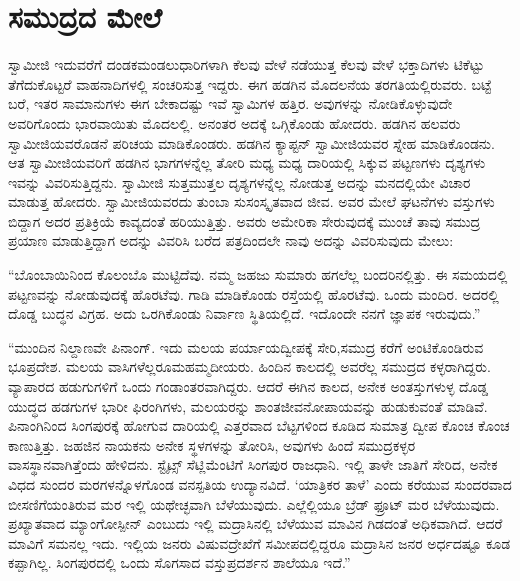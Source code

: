 
\chapter{ಸಮುದ್ರದ ಮೇಲೆ}

 ಸ್ವಾಮೀಜಿ ಇದುವರೆಗೆ ದಂಡಕಮಂಡಲುಧಾರಿಗಳಾಗಿ ಕೆಲವು ವೇಳೆ ನಡೆಯುತ್ತ ಕೆಲವು ವೇಳೆ ಭಕ್ತಾದಿಗಳು ಟಿಕೆಟ್ಟು ತೆಗೆದುಕೊಟ್ಟರೆ ವಾಹನಾದಿಗಳಲ್ಲಿ ಸಂಚರಿಸುತ್ತ ಇದ್ದರು. ಈಗ ಹಡಗಿನ ಮೊದಲನೆಯ ತರಗತಿಯಲ್ಲಿರುವರು. ಬಟ್ಟೆ ಬರೆ, ಇತರ ಸಾಮಾನುಗಳು ಈಗ ಬೇಕಾದಷ್ಟು ಇವೆ ಸ್ವಾಮಿಗಳ ಹತ್ತಿರ. ಅವುಗಳನ್ನು ನೋಡಿಕೊಳ್ಳುವುದೇ ಅವರಿಗೊಂದು ಭಾರವಾಯಿತು ಮೊದಲಲ್ಲಿ. ಅನಂತರ ಅದಕ್ಕೆ ಒಗ್ಗಿಕೊಂಡು ಹೋದರು. ಹಡಗಿನ ಹಲವರು ಸ್ವಾಮೀಜಿಯವರೊಡನೆ ಪರಿಚಯ ಮಾಡಿಕೊಂಡರು. ಹಡಗಿನ ಕ್ಯಾಪ್ಟನ್ ಸ್ವಾಮೀಜಿಯವರ ಸ್ನೇಹ ಮಾಡಿಕೊಂಡನು. ಆತ ಸ್ವಾಮೀಜಿಯವರಿಗೆ ಹಡಗಿನ ಭಾಗಗಳನ್ನೆಲ್ಲ ತೋರಿ ಮಧ್ಯ ಮಧ್ಯ ದಾರಿಯಲ್ಲಿ ಸಿಕ್ಕುವ ಪಟ್ಟಣಗಳು ದೃಶ್ಯಗಳು ಇವನ್ನು ವಿವರಿಸುತ್ತಿದ್ದನು. ಸ್ವಾಮೀಜಿ ಸುತ್ತಮುತ್ತಲ ದೃಶ್ಯಗಳನ್ನೆಲ್ಲ ನೋಡುತ್ತ ಅದನ್ನು ಮನದಲ್ಲಿಯೇ ವಿಚಾರ ಮಾಡುತ್ತ ಹೋದರು. ಸ್ವಾಮೀಜಿಯವರದು ತುಂಬಾ ಸುಸಂಸ್ಕೃತವಾದ ಜೀವ. ಅವರ ಮೇಲೆ ಘಟನೆಗಳು ವಸ್ತುಗಳು ಬಿದ್ದಾಗ ಅದರ ಪ್ರತಿಕ್ರಿಯೆ ಕಾವ್ಯದಂತೆ ಹರಿಯುತ್ತಿತ್ತು. ಅವರು ಅಮೇರಿಕಾ ಸೇರುವುದಕ್ಕೆ ಮುಂಚೆ ತಾವು ಸಮುದ್ರ ಪ್ರಯಾಣ ಮಾಡುತ್ತಿದ್ದಾಗ ಅದನ್ನು ವಿವರಿಸಿ ಬರೆದ ಪತ್ರದಿಂದಲೇ ನಾವು ಅದನ್ನು ವಿವರಿಸುವುದು ಮೇಲು: 

 “ಬೊಂಬಾಯಿನಿಂದ ಕೊಲಂಬೊ ಮುಟ್ಟಿದೆವು. ನಮ್ಮ ಜಹಜು ಸುಮಾರು ಹಗಲೆಲ್ಲ ಬಂದರಿನಲ್ಲಿತ್ತು. ಈ ಸಮಯದಲ್ಲಿ ಪಟ್ಟಣವನ್ನು ನೋಡುವುದಕ್ಕೆ ಹೊರಟೆವು. ಗಾಡಿ ಮಾಡಿಕೊಂಡು ರಸ್ತೆಯಲ್ಲಿ ಹೊರಟೆವು. ಒಂದು ಮಂದಿರ. ಅದರಲ್ಲಿ ದೊಡ್ಡ ಬುದ್ಧನ ವಿಗ್ರಹ. ಅದು ಒರಗಿಕೊಂಡು ನಿರ್ವಾಣ ಸ್ಥಿತಿಯಲ್ಲಿದೆ. ಇದೊಂದೇ ನನಗೆ ಜ್ಞಾಪಕ ಇರುವುದು.” 

\newpage

 “ಮುಂದಿನ ನಿಲ್ದಾಣವೇ ಪಿನಾಂಗ್. ಇದು ಮಲಯ ಪರ್ಯಾಯದ್ವೀಪಕ್ಕೆ ಸೇರಿ,\break ಸಮುದ್ರ ಕರೆಗೆ ಅಂಟಿಕೊಂಡಿರುವ ಭೂಪ್ರದೇಶ. ಮಲಯ ವಾಸಿಗಳೆಲ್ಲರೂ\break ಮಹಮ್ಮದೀಯರು. ಹಿಂದಿನ ಕಾಲದಲ್ಲಿ ಅವರೆಲ್ಲ ಸಮುದ್ರದ ಕಳ್ಳರಾಗಿದ್ದರು. ವ್ಯಾಪಾರದ ಹಡುಗುಗಳಿಗೆ ಒಂದು ಗಂಡಾಂತರವಾಗಿದ್ದರು. ಆದರೆ ಈಗಿನ ಕಾಲದ, ಅನೇಕ ಅಂತಸ್ತುಗಳುಳ್ಳ ದೊಡ್ಡ ಯುದ್ಧದ ಹಡಗುಗಳ ಭಾರೀ ಫಿರಂಗಿಗಳು, ಮಲಯರನ್ನು ಶಾಂತಜೀವನೋಪಾಯವನ್ನು ಹುಡುಕುವಂತೆ ಮಾಡಿವೆ. ಪಿನಾಂಗಿನಿಂದ ಸಿಂಗಪುರಕ್ಕೆ ಹೋಗುವ ದಾರಿಯಲ್ಲಿ ಎತ್ತರವಾದ ಬೆಟ್ಟಗಳಿಂದ ಕೂಡಿದ ಸುಮಾತ್ರ ದ್ವೀಪ ಕೊಂಚ ಕೊಂಚ ಕಾಣುತ್ತಿತ್ತು. ಜಹಜಿನ ನಾಯಕನು ಅನೇಕ ಸ್ಥಳಗಳನ್ನು ತೋರಿಸಿ, ಅವುಗಳು ಹಿಂದೆ ಸಮುದ್ರಕಳ್ಳರ ವಾಸಸ್ಥಾನವಾಗಿತ್ತೆಂದು ಹೇಳಿದನು. ಸ್ಟೈಟ್ಸ್ ಸೆಟ್ಲಿಮೆಂಟಿಗೆ ಸಿಂಗಪುರ ರಾಜಧಾನಿ. ಇಲ್ಲಿ ತಾಳೇ ಜಾತಿಗೆ ಸೇರಿದ, ಅನೇಕ ವಿಧದ ಸುಂದರ ಮರಗಳನ್ನೊಳಗೊಂಡ ವನಸ್ಪತಿಯ ಉದ್ಯಾನವಿದೆ. ‘ಯಾತ್ರಿಕರ ತಾಳೆ’ ಎಂದು ಕರೆಯುವ ಸುಂದರವಾದ ಬೀಸಣಿಗೆಯಂತಿರುವ ಮರ ಇಲ್ಲಿ ಯಥೇಚ್ಛವಾಗಿ ಬೆಳೆಯುವುದು. ಎಲ್ಲೆಲ್ಲಿಯೂ ಬ್ರೆಡ್ ಫ್ರೂಟ್ ಮರ ಬೆಳೆಯುವುದು. ಪ್ರಖ್ಯಾತವಾದ ಮ್ಯಾಂಗೋಸ್ಪೀನ್ ಎಂಬುದು ಇಲ್ಲಿ ಮದ್ರಾಸಿನಲ್ಲಿ ಬೆಳೆಯುವ ಮಾವಿನ ಗಿಡದಂತೆ ಅಧಿಕವಾಗಿದೆ. ಆದರೆ ಮಾವಿಗೆ ಸಮನಲ್ಲ ಇದು. ಇಲ್ಲಿಯ ಜನರು ವಿಷುವದ್ರೇಖೆಗೆ ಸಮೀಪದಲ್ಲಿದ್ದರೂ ಮದ್ರಾಸಿನ ಜನರ ಅರ್ಧದಷ್ಟೂ ಕೂಡ ಕಪ್ಪಾಗಿಲ್ಲ. ಸಿಂಗಪುರದಲ್ಲಿ ಒಂದು ಸೊಗಸಾದ ವಸ್ತುಪ್ರದರ್ಶನ ಶಾಲೆಯೂ ಇದೆ.” 


